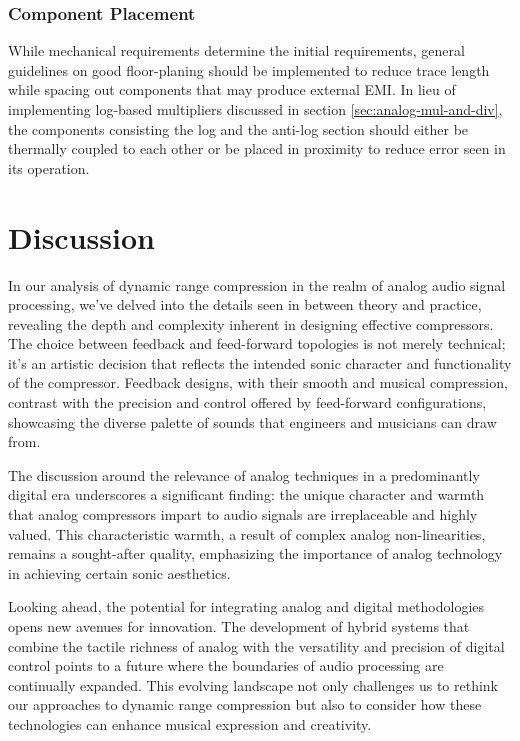 \documentclass[10pt]{article}
\begin{document}
\begin{multicols*}{2}
                \subsubsection{Component Placement}
                    While mechanical requirements determine the initial requirements, general guidelines on good floor-planing should be implemented to reduce trace length while spacing out components that may produce external EMI. In lieu of implementing log-based multipliers discussed in section \ref{sec:analog-mul-and-div}, the components consisting the log and the anti-log section should either be thermally coupled to each other or be placed in proximity to reduce error seen in its operation.
        
        \section*{Discussion}
            In our analysis of dynamic range compression in the realm of analog audio signal processing, we've delved into the details seen in between theory and practice, revealing the depth and complexity inherent in designing effective compressors. The choice between feedback and feed-forward topologies is not merely technical; it's an artistic decision that reflects the intended sonic character and functionality of the compressor. Feedback designs, with their smooth and musical compression, contrast with the precision and control offered by feed-forward configurations, showcasing the diverse palette of sounds that engineers and musicians can draw from.\par
            The discussion around the relevance of analog techniques in a predominantly digital era underscores a significant finding: the unique character and warmth that analog compressors impart to audio signals are irreplaceable and highly valued. This characteristic warmth, a result of complex analog non-linearities, remains a sought-after quality, emphasizing the importance of analog technology in achieving certain sonic aesthetics.\par 
            Looking ahead, the potential for integrating analog and digital methodologies opens new avenues for innovation. The development of hybrid systems that combine the tactile richness of analog with the versatility and precision of digital control points to a future where the boundaries of audio processing are continually expanded. This evolving landscape not only challenges us to rethink our approaches to dynamic range compression but also to consider how these technologies can enhance musical expression and creativity.


\end{multicols*}
\end{document}
